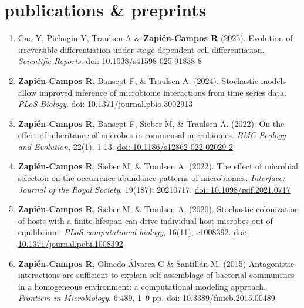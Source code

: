 \documentclass[]{friggeri-cv} %
\begin{document}

\section{publications \& preprints}

\begin{enumerate}

\item  Gao Y, Pichugin Y, Traulsen A \& \textbf{Zapién-Campos R} (2025). Evolution of irreversible differentiation under stage-dependent cell differentiation. \textit{Scientific Reports}. \href{https://doi.org/10.1038/s41598-025-91838-8}{doi: 10.1038/s41598-025-91838-8}

\item \textbf{Zapién-Campos R}, Bansept F, \& Traulsen A. (2024). Stochastic models allow improved inference of microbiome interactions from time series data. \textit{PLoS Biology}. \href{https://doi.org/10.1371/journal.pbio.3002913}{doi: 10.1371/journal.pbio.3002913}

\item  \textbf{Zapién-Campos R}, Bansept F, Sieber M, \& Traulsen A. (2022). On the effect of inheritance of microbes in commensal microbiomes. \textit{BMC Ecology and Evolution}, 22(1), 1-13. \href{https://doi.org/10.1186/s12862-022-02029-2}{doi: 10.1186/s12862-022-02029-2}

\item  \textbf{Zapién-Campos R}, Sieber M, \& Traulsen A. (2022). The effect of microbial selection on the occurrence-abundance patterns of microbiomes. \textit{Interface: Journal of the Royal Society}, 19(187): 20210717. \href{https://doi.org/10.1098/rsif.2021.0717}{doi: 10.1098/rsif.2021.0717}

\item \textbf{Zapién-Campos R}, Sieber M, \& Traulsen A. (2020). Stochastic colonization of hosts with a finite lifespan can drive individual host microbes out of equilibrium. \textit{PLoS computational biology}, 16(11), e1008392. \href{https://doi.org/10.1371/journal.pcbi.1008392}{doi: 10.1371/journal.pcbi.1008392}

\item \textbf{Zapién-Campos R}, Olmedo-Álvarez G \& Santillán M. (2015) Antagonistic interactions are sufficient to explain self-assemblage of bacterial communities in a homogeneous environment: a computational modeling approach. \textit{Frontiers in Microbiology}. 6:489, 1--9 pp. \href{http://dx.doi.org/10.3389/fmicb.2015.00489}{doi: 10.3389/fmicb.2015.00489}

\end{enumerate}
\end{document}
